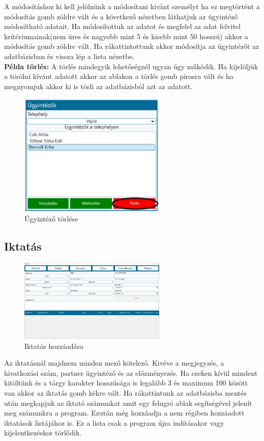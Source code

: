 \documentclass[
]{thesis-ekf}
\theoremstyle{definition}
\theoremstyle{remark}
\begin{document}
A módosításhoz ki kell jelölnünk a módosítani kívánt személyt ha ez megtörtént a módosítás gomb zöldre vált és a következő nézetben láthatjuk az ügyintéző módosítható adatait. Ha módosítottuk az adatot és megfelel az adat felvitel kritériumainak(nem üres és nagyobb mint 5 és kisebb mint 50 hosszú) akkor a módosítás gomb zöldre vált. Ha rákattintottunk akkor módosítja az ügyintézőt az adatbázisban és vissza lép a lista nézetbe.\\
\textbf{Példa törlés:}
A törlés mindegyik lehetőségnél ugyan úgy működik. Ha kijelöljük a törölni kívánt adatott akkor az ablakon a törlés gomb pirosra vált és ha megnyomjuk akkor ki is törli az adatbázisból azt az adatott.
\begin{figure}[h!]
	\centering
	\includegraphics[width=7cm]{dokukepek/ctorzsdelete}
	\caption{Ügyintéző törlése}
	\label{fig:ctorzsdelete}
\end{figure}
\subsection{Iktatás}
\begin{figure}[h!]
	\centering
	\includegraphics[width=7cm]{dokukepek/ciktatas}
	\caption{Iktatás hozzáadása}
	\label{fig:ciktatas}
\end{figure}
Az iktatásnál majdnem minden mező kötelező. Kivéve a megjegyzés, a hivatkozási szám, partner ügyintéző és az előzményezés. Ha ezeken kívül mindent kitöltünk és a tárgy karakter hosszúsága is legalább 3 és maximum 100 között van akkor az iktatás gomb kékre vált. Ha rákattintunk az adatbázisba mentés után megkapjuk az iktató számunkat amit egy felugró ablak segítségével jelenít meg számunkra a program. Ezután még hozzáadja a nem régiben hozzáadott iktatások listájához is. Ez a lista csak a program újra indításakor vagy kijelentkezéskor törlődik.
\end{document}
